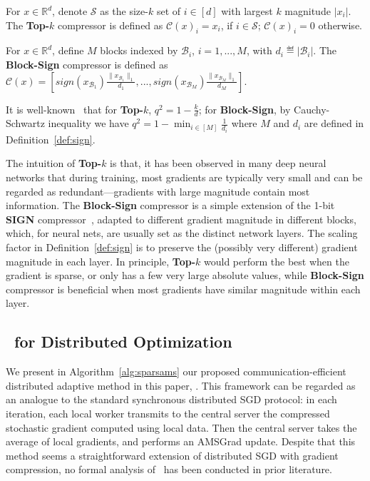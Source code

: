 \documentclass[11pt]{article}
\begin{document}
\begin{definition}[Top-$k$]\label{def:topk}
For $x\in\mathbb R^d$, denote $\mathcal S$ as the size-$k$ set of $i\in[d]$ with largest $k$ magnitude $|x_i|$. The \textbf{Top-$k$} compressor is defined as $\mathcal C(x)_i=x_i$, if $i\in\mathcal S$; $\mathcal C(x)_i=0$ otherwise.
\end{definition}

\begin{definition}\label{def:sign}
For $x\in\mathbb R^d$, define $M$ blocks indexed by $\mathcal B_i$, $i=1,...,M$, with $d_i\eqdef |\mathcal B_i|$. The \textbf{Block-Sign} compressor is defined as $\mathcal C(x)=[sign(x_{\mathcal B_1})\frac{\|x_{\mathcal B_1}\|_1}{d_1},..., sign(x_{\mathcal B_M}) \frac{\|x_{\mathcal B_M}\|_1}{d_M}]$. 
\end{definition}

\begin{Remark}
It is well-known~\cite{stich2018sparsified,Proc:Zheng_NIPS19} that for \textbf{Top-$k$}, $q^2=1-\frac{k}{d}$; for \textbf{Block-Sign}, by Cauchy-Schwartz inequality we have $q^2=1-\min_{i\in [M]} \frac{1}{d_i}$ where $M$ and $d_i$ are defined in Definition~\ref{def:sign}.
\end{Remark}

The intuition of \textbf{Top-$k$} is that, it has been observed in many deep neural networks that during training, most gradients are typically very small and can be regarded as redundant---gradients with large magnitude contain most information. The \textbf{Block-Sign} compressor is a simple extension of the 1-bit \textbf{SIGN} compressor~\cite{Proc:Seide14,bernstein2018signsgd}, adapted to different gradient magnitude in different blocks, which, for neural nets, are usually set as the distinct network layers. The scaling factor in Definition~\ref{def:sign} is to preserve the (possibly very different) gradient magnitude in each layer. In principle, \textbf{Top-$k$} would perform the best when the gradient is sparse, or only has a few very large absolute values, while \textbf{Block-Sign} compressor is beneficial when most gradients have similar magnitude within each layer.


\subsection{\algo\ for Distributed Optimization}


We present in Algorithm~\ref{alg:sparsams} our proposed communication-efficient distributed adaptive method in this paper, \algo. This framework can be regarded as an analogue to the standard synchronous distributed SGD protocol: in each iteration, each local worker transmits to the central server the compressed stochastic gradient computed using local data. Then the central server takes the average of local gradients, and performs an AMSGrad update. Despite that this method seems a straightforward extension of distributed SGD with gradient compression, no formal analysis of \algo\  has been conducted in prior literature.
\end{document}
